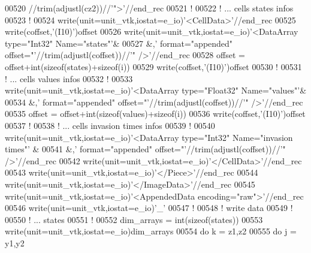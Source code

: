 \begin{DoxyCode}
00520                                    //trim(adjustl(cz2))//\textcolor{stringliteral}{'">'}//end\_rec
00521 \textcolor{comment}{!}
00522 \textcolor{comment}{! ... cells states infos}
00523 \textcolor{comment}{!}
00524 \textcolor{keyword}{write}(unit=unit\_vtk,iostat=e\_io)\textcolor{stringliteral}{'<CellData>'}//end\_rec
00525 \textcolor{keyword}{write}(coffset,\textcolor{stringliteral}{'(I10)'})offset
00526 \textcolor{keyword}{write}(unit=unit\_vtk,iostat=e\_io)\textcolor{stringliteral}{'<DataArray type="Int32" Name="states"'}&
00527 &,\textcolor{stringliteral}{' format="appended" offset="'}//trim(adjustl(coffset))//\textcolor{stringliteral}{'" />'}//end\_rec
00528 offset = offset+int(sizeof(states)+sizeof(i))
00529 \textcolor{keyword}{write}(coffset,\textcolor{stringliteral}{'(I10)'})offset
00530 \textcolor{comment}{!}
00531 \textcolor{comment}{! ... cells values infos}
00532 \textcolor{comment}{!}
00533 \textcolor{keyword}{write}(unit=unit\_vtk,iostat=e\_io)\textcolor{stringliteral}{'<DataArray type="Float32" Name="values"'}&
00534 &,\textcolor{stringliteral}{' format="appended" offset="'}//trim(adjustl(coffset))//\textcolor{stringliteral}{'" />'}//end\_rec
00535 offset = offset+int(sizeof(values)+sizeof(i))
00536 \textcolor{keyword}{write}(coffset,\textcolor{stringliteral}{'(I10)'})offset
00537 \textcolor{comment}{!}
00538 \textcolor{comment}{! ... cells invasion times infos}
00539 \textcolor{comment}{!}
00540 \textcolor{keyword}{write}(unit=unit\_vtk,iostat=e\_io)\textcolor{stringliteral}{'<DataArray type="Int32" Name="invasion times"'}
      &
00541 &,\textcolor{stringliteral}{' format="appended" offset="'}//trim(adjustl(coffset))//\textcolor{stringliteral}{'" />'}//end\_rec
00542 \textcolor{keyword}{write}(unit=unit\_vtk,iostat=e\_io)\textcolor{stringliteral}{'</CellData>'}//end\_rec
00543 \textcolor{keyword}{write}(unit=unit\_vtk,iostat=e\_io)\textcolor{stringliteral}{'</Piece>'}//end\_rec
00544 \textcolor{keyword}{write}(unit=unit\_vtk,iostat=e\_io)\textcolor{stringliteral}{'</ImageData>'}//end\_rec
00545 \textcolor{keyword}{write}(unit=unit\_vtk,iostat=e\_io)\textcolor{stringliteral}{'<AppendedData encoding="raw">'}//end\_rec
00546 \textcolor{keyword}{write}(unit=unit\_vtk,iostat=e\_io)\textcolor{stringliteral}{'\_'}
00547 \textcolor{comment}{!}
00548 \textcolor{comment}{! write data }
00549 \textcolor{comment}{!}
00550 \textcolor{comment}{! ... states}
00551 \textcolor{comment}{!}
00552 dim\_arrays = int(sizeof(states))
00553 \textcolor{keyword}{write}(unit=unit\_vtk,iostat=e\_io)dim\_arrays
00554 \textcolor{keyword}{do} k = z1,z2
00555    \textcolor{keyword}{do} j = y1,y2

\end{DoxyCode}
